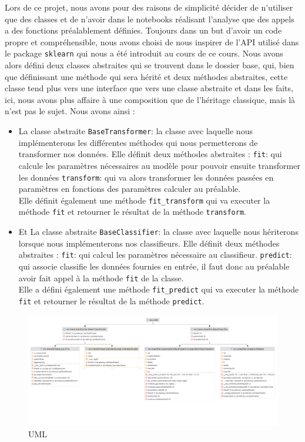 \documentclass{NewTeX}
\begin{document}
    Lors de ce projet, nous avons pour des raisons de simplicité décider de n'utiliser que des classes et de n'avoir dans le notebooks réalisant l'analyse que des appels a des fonctions préalablement définies.
    Toujours dans un but d'avoir un code propre et compréhensible, nous avons choisi de nous inspirer de l'API utilisé dans le package \verb|sklearn| qui nous a été introduit au cours de ce cours.
    Nous avons alors défini deux classes abstraites qui se trouvent dans le dossier base, qui, bien que définissant une méthode qui sera hérité et deux méthodes abstraites, cette classe tend plus vers une interface que vers une classe abstraite et dans les faits, ici, nous avons plus affaire à une composition que de l'héritage classique, mais là n'est pas le sujet.
    Nous avons ainsi :
    \begin{itemize}
        \item La classe abstraite \verb|BaseTransformer|: la classe avec laquelle nous implémenterons les différentes méthodes qui nous permetterons de transformer nos données.
        Elle définit deux méthodes abstraites :
        \subitem \verb|fit|: qui calcule les paramètres nécessaires au modèle pour pouvoir ensuite transformer les données
        \subitem \verb|transform|: qui va alors transformer les données passées en paramètres en fonctions des paramètres calculer au préalable. \\
        Elle définit également une méthode \verb|fit_transform| qui va executer la méthode \verb|fit| et retourner le résultat de la méthode \verb|transform|.
        \item Et La classe abstraite \verb|BaseClassifier|: la classe avec laquelle nous hériterons lorsque nous implémenterons nos classifieurs.
        Elle définit deux méthodes abstraites :
        \subitem \verb|fit|: qui calcul les paramètres nécessaire au classifieur.
        \subitem \verb|predict|: qui associe classifie les données fournies en entrée, il faut donc au préalable avoir fait appel à la méthode \verb|fit| de la classe. \\
        Elle a défini également une méthode \verb|fit_predict| qui va executer la méthode \verb|fit| et retourner le résultat de la méthode \verb|predict|.
    \end{itemize}

    \begin{figure}[H]
        \centering
        \includegraphics[scale=0.12]{./api_uml}
        \caption{UML}
        \label{fig:uml}
    \end{figure}
\end{document}
